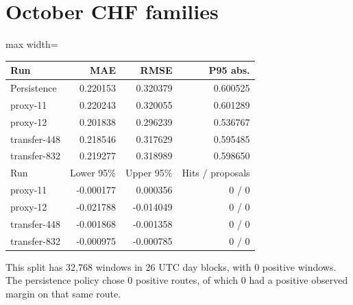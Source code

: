 \documentclass[11pt,oneside,openany]{book}
\begin{document}
\section*{October CHF families}
\begin{center}\footnotesize\sffamily\setlength{\tabcolsep}{3.5pt}\renewcommand{\arraystretch}{1.2}
\begin{adjustbox}{max width=\linewidth}\begin{tabular}{@{}lrrr@{}}\toprule
Run & MAE & RMSE & P95 abs. \\ \midrule
Persistence & 0.220153 & 0.320379 & 0.600525 \\
proxy-11 & 0.220243 & 0.320055 & 0.601289 \\
proxy-12 & 0.201838 & 0.296239 & 0.536767 \\
transfer-448 & 0.218546 & 0.317629 & 0.595485 \\
transfer-832 & 0.219277 & 0.318989 & 0.598650 \\
Run & Lower 95\% & Upper 95\% & Hits / proposals \\
proxy-11 & -0.000177 & 0.000356 & 0 / 0 \\
proxy-12 & -0.021788 & -0.014049 & 0 / 0 \\
transfer-448 & -0.001868 & -0.001358 & 0 / 0 \\
transfer-832 & -0.000975 & -0.000785 & 0 / 0 \\
\bottomrule\end{tabular}\end{adjustbox}\end{center}
This split has 32,768 windows in 26 UTC day blocks, with 0 positive windows. The persistence policy chose 0 positive routes, of which 0 had a positive observed margin on that same route.
\end{document}

